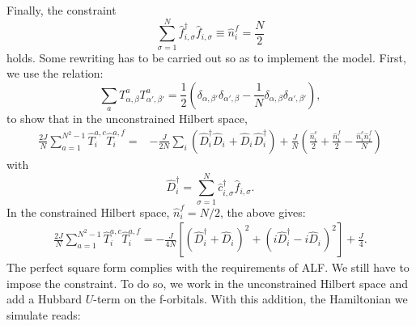 Finally, the constraint
\begin{equation}
   \sum_{\sigma=1}^{N}  \hat{f}^{\dagger}_{i,\sigma}   \hat{f}^{\phantom\dagger}_{i,\sigma}  \equiv  \hat{n}^{f}_i = \frac{N}{2}
\end{equation}
holds. Some rewriting has to be carried out so as to implement  the model.
First, we  use the  relation:
\begin{equation*}
	\sum_{a} T^{a}_{\alpha,\beta} T^{a}_{\alpha',\beta'} = \frac{1}{2} \left(  \delta_{\alpha,\beta'}  \delta_{\alpha',\beta} - \frac{1}{N} \delta_{\alpha,\beta} \delta_{\alpha', \beta'} \right), 
\end{equation*}
to  show that  in the unconstrained Hilbert space,
\begin{align}
	 \frac{2 J}{N} \sum_{ a=1  }^{N^2 -1}  \hat{T}^{a,c}_{i}  \hat{T}^{a,f}_{i}   = &   - \frac{J}{2N} \sum_{i}  \left( 
                \hat{D}^{\dagger}_{i} \hat{D}^{\phantom\dagger}_{i}   +    \hat{D}^{\phantom\dagger}_{i} \hat{D}^{\dagger}_{i}    \right)    + \frac{J}{N}   \left(   \frac{\hat{n}^{c}_i}{2}  + \frac{\hat{n}^{f}_i}{2} -  \frac{\hat{n}^{c}_i \hat{n}^{f}_i}{N}   \right) \nonumber 
 \end{align}
with
\begin{equation*}
	   \hat{D}^{\dagger}_{i}   =  \sum_{\sigma=1}^{N} \hat{c}^{\dagger}_{i,\sigma}  \hat{f}^{\phantom\dagger}_{i,\sigma}.
\end{equation*}
In the constrained Hilbert space, $\hat{n}^{f}_i = N/2 $, the above gives:
\begin{align}
	 \frac{2 J}{N} \sum_{ a=1  }^{N^2 -1}  \hat{T}^{a,c}_{i}  \hat{T}^{a,f}_{i}   =     -  \frac{J}{4N}    \left[ \left(   \hat{D}^{\dagger}_{i}  + \hat{D}^{\phantom\dagger}_{i}    \right)^{2}  + 
                                                       \left(  i\hat{D}^{\dagger}_{i}  - i  \hat{D}^{\phantom\dagger}_{i}    \right)^2  \right] + \frac{J}{4}.  
 \end{align}
The perfect square form complies with the requirements of ALF.
We still have to impose the constraint.
To do so, we work in the unconstrained Hilbert space and add a Hubbard  $U$-term on  the f-orbitals.
With this addition, the Hamiltonian we simulate reads: 

